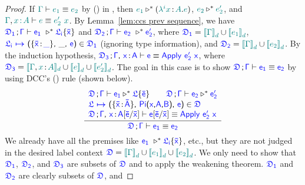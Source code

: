 \begin{lemma}
\begin{proof}
If $\color{teal}{\Gamma}\color{black} \vdash \color{teal}{e_1}\color{black} \equiv \color{teal}{e_2}\color{black}$ by () in {\ccs}, then 
$\color{teal}{e_1}\color{black} \triangleright^* (\color{teal}{\lambda^i x}\color{black} \hspace{0.5mm}{:}\hspace{0.5mm} \color{teal}{A}\color{black} . \color{teal}{e}\color{black})$, 
$\color{teal}{e_2}\color{black} \triangleright^* \color{teal}{e_2'}\color{black}$, 
and $\helper{\Gamma}, \helper{x \goodcolon A} \vdash \helper{e} \equiv \helper{e_2'\ x}$. 
By Lemma~\ref{lem:ccs prev sequence}, we have 
$\target{\fdef_1} \semicolon \target{\Gamma} \vdash \target{e_1}\ \triangleright^* \targetlab{\flabel_i}{\bar{x}}$ and
$\target{\fdef_2} \semicolon \target{\Gamma} \vdash \target{e_2}\ \triangleright^* \target{e_2'}$, where 
$\target{\fdef_1} = \helper{\bbracket{\Gamma}_d} \cup \helper{\bbracket{e_1}_d}$,
$\itemdef{\target{\flabel_i}}{\itemtype{\bar{x}}{\_}}{\_}{\target{e}} \in \target{\fdef_1}$ (ignoring type information), and
$\target{\fdef_2} = \helper{\bbracket{\Gamma}_d} \cup \helper{\bbracket{e_2}_d}$. 
By the induction hypothesis,
$\target{\fdef_3} \semicolon \target{\Gamma} \sfcomma \itemtype{x}{A} \vdash \target{e} \equiv \targetapp{e_2'}{x}$, where
$\target{\fdef_3} = \hbracketd{\helper{\Gamma}, \helper{x} \goodcolon \helper{A}} \cup \helper{\bbracket{e}_d} \cup \helper{\bbracket{e_2'}_d}$. The goal in this case is to show
$\target{\fdef}\semicolon \target{\Gamma} \vdash \target{e_1} \equiv \target{e_2}$ by using DCC's () rule (shown below).
\begin{equation*}
	\frac
		{\begin{array}{l}
		  \target{\fdef}\semicolon \target{\Gamma} \vdash \target{e_1} \triangleright^* \targetlab{\flabel}{\bar{e}} \qquad
          \target{\fdef}\semicolon \target{\Gamma} \vdash \target{e_2} \triangleright^* \target{e_2'} \\
          \itemdef{\target{\flabel}}{\itemtype{\bar{x}}{\bar{A}}}{\targetpi{x}{A}{B}}{\target{e}} \in \target{\fdef} \\
          \target{\fdef}\semicolon \target{\Gamma}\sfcomma \itemtype{x}{A} \targetsub{\bar{e}}{\bar{x}} \vdash 
          \target{e}\targetsub{\bar{e}}{\bar{x}} \equiv \targetapp{e_2'}{x}
    	\end{array}}
		{\target{\fdef}\semicolon \target{\Gamma} \vdash \target{e_1} \equiv \target{e_2}}
\end{equation*}
We already have all the premises like $\target{e_1}\ \triangleright^* \targetlab{\flabel_i}{\bar{x}}$, etc., but they are not judged in the desired label context $\target{\fdef} = \helper{\bbracket{\Gamma}_d} \cup \helper{\bbracket{e_1}_d} \cup \helper{\bbracket{e_2}_d}$. We only need to show that $\target{\fdef_1}$, $\target{\fdef_2}$, and $\target{\fdef_3}$ are subsets of $\target{\fdef}$ and to apply the weakening theorem. $\target{\fdef_1}$ and $\target{\fdef_2}$ are clearly subsets of $\target{\fdef}$, and

\end{proof}
\end{lemma}
